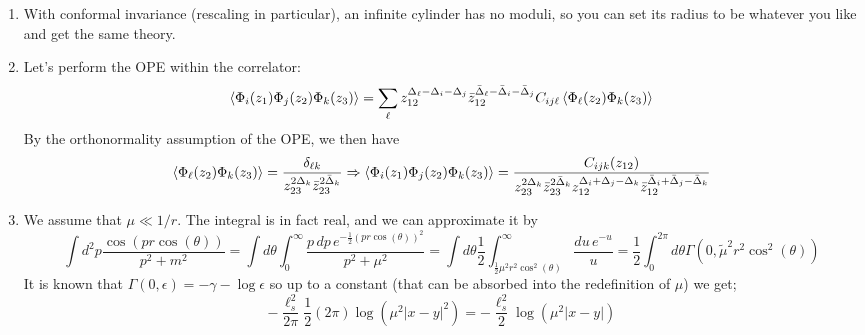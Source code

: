 \documentclass[11pt]{article}
\begin{document}
\begin{enumerate}
	 
	
%
	\item With conformal invariance (rescaling in particular), an infinite cylinder has no moduli, so you can set its radius to be whatever you like and get the same theory. 
	
	\item Let's perform the OPE within the correlator: 
	\[
		\braket{\Phi_i(z_1) \Phi_j(z_2) \Phi_k (z_3)} = \sum_{\ell} z_{12}^{\Delta_\ell - \Delta_i - \Delta_j} \bar z_{12}^{\bar \Delta_\ell - \bar \Delta_i - \bar \Delta_j} C_{ij\ell} \braket{ \Phi_{\ell}(z_2) \Phi_k(z_3)}
	\]
	By the orthonormality assumption of the OPE, we then have
	\[
	\braket{\Phi_\ell(z_2) \Phi_k (z_3)} = \frac{\delta_{\ell k}}{z_{23}^{2\Delta_k} \bar z_{23}^{2 \bar \Delta_k} }	\Rightarrow \braket{\Phi_i(z_1) \Phi_j(z_2) \Phi_k (z_3)} = \frac{C_{ijk} (z_{12})}{z_{23}^{2 \Delta_k} \bar z_{23}^{2 \bar \Delta_k} z_{12}^{\Delta_i+\Delta_j - \Delta_k} \bar z_{12}^{\bar \Delta_i+\bar \Delta_j - \bar \Delta_k} }
	\] 
	\item We assume that $\mu \ll 1/r$. The integral is in fact real, and we can approximate it by 
	\[
		\int d^2 p \frac{\cos(p r \cos(\theta))}{p^2 + m^2} = \int d\theta \int_0^\infty \frac{p\, dp\, e^{-\frac12 (p r \cos(\theta))^2}}{p^2 + \mu^2} = \int d\theta \frac12 \int_{\frac12 \mu^2 r^2 \cos^2(\theta)}^\infty \frac{du\, e^{-u}}{u} = \frac12 \int_{0}^{2\pi} d\theta \Gamma(0, \tilde \mu^2 r^2 \cos^2(\theta))
	\]
	It is known that $\Gamma(0, \epsilon) = -\gamma - \log \epsilon$ so up to a constant (that can be absorbed into the redefinition of $\mu$) we get;
	\[
		-\frac{\ell_s^2}{2\pi} \frac12 (2 \pi) \log(\mu^2 |x-y|^2) = - \frac{\ell_s^2}{2} \log(\mu^2 |x-y|)
	\]
	

\end{enumerate}
\end{document}
